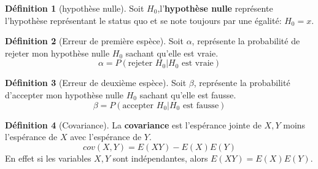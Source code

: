 \documentclass[12pt]{book}
\newcommand\todo[1]{\phantom{#1}}
\theoremstyle{definition}
\newtheorem{definition}{Définition}[section]
\begin{document}
\begin{definition}[hypothèse nulle]
    \label{def:hypothese_nulle}
    Soit $H_0$,l'\textbf{hypothèse nulle} représente l'hypothèse représentant le status quo et 
    se note toujours par une égalité: $H_0 = x$.
\end{definition}

\begin{definition}[Erreur de première espèce]
    \label{def:erreur_alpha}
    Soit $\alpha$, représente la probabilité de rejeter mon hypothèse nulle $H_0$ \todo{Add link} sachant
    qu'elle est vraie.
    $$\alpha = P(\text{rejeter }H_0 | H_0\text{ est vraie})$$
\end{definition}

\begin{definition}[Erreur de deuxième espèce]
    \label{def:erreur_beta}
    Soit $\beta$, représente la probabilité d'accepter mon hypothèse nulle $H_0$ \todo{Add link} sachant
    qu'elle est fausse.
    $$\beta = P(\text{accepter }H_0 | H_0\text{ est fausse})$$
\end{definition}

\begin{definition}[Covariance]
    La \textbf{covariance} est l'espérance jointe de $X,Y$ moins l'espérance de $X$ avec l'espérance de $Y$.
    $$ cov(X, Y) = E(XY) - E(X)E(Y) $$
    En effet si les variables $X,Y$ sont indépendantes, alors $E(XY) = E(X)E(Y)$.
\end{definition}
\end{document}
